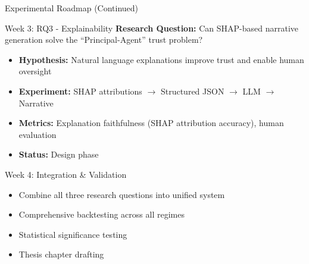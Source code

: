 \documentclass[aspectratio=169]{beamer}
\begin{document}
\begin{frame}{Experimental Roadmap (Continued)}
\begin{block}{Week 3: RQ3 - Explainability}
\textbf{Research Question:} Can SHAP-based narrative generation solve the ``Principal-Agent'' trust problem?

\begin{itemize}
    \item \textbf{Hypothesis:} Natural language explanations improve trust and enable human oversight
    \item \textbf{Experiment:} SHAP attributions $\rightarrow$ Structured JSON $\rightarrow$ LLM $\rightarrow$ Narrative
    \item \textbf{Metrics:} Explanation faithfulness (SHAP attribution accuracy), human evaluation
    \item \textbf{Status:} Design phase
\end{itemize}
\end{block}

\vspace{0.3cm}

\begin{block}{Week 4: Integration \& Validation}
\begin{itemize}
    \item Combine all three research questions into unified system
    \item Comprehensive backtesting across all regimes
    \item Statistical significance testing
    \item Thesis chapter drafting
\end{itemize}
\end{block}
\end{frame}
\end{document}
